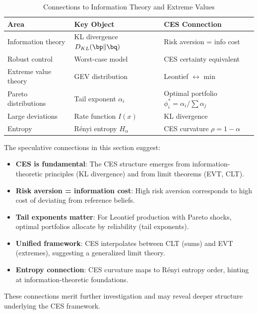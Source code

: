 \begin{table}[H]
\centering
\caption{Connections to Information Theory and Extreme Values}
\label{tab:ac-adv-summary}
\renewcommand{\arraystretch}{1.5}
\begin{tabular}{@{}lll@{}}
\toprule
\textbf{Area} & \textbf{Key Object} & \textbf{CES Connection} \\
\midrule
Information theory & KL divergence $D_{KL}(\bp \| \bq)$ & Risk aversion = info cost \\
Robust control & Worst-case model & CES certainty equivalent \\
Extreme value theory & GEV distribution & Leontief $\leftrightarrow$ min \\
Pareto distributions & Tail exponent $\alpha_i$ & Optimal portfolio $\phi_i^* = \alpha_i / \sum \alpha_j$ \\
Large deviations & Rate function $I(x)$ & KL divergence \\
Entropy & Rényi entropy $H_\alpha$ & CES curvature $\rho = 1 - \alpha$ \\
\bottomrule
\end{tabular}
\end{table}

\begin{callouttip}
The speculative connections in this section suggest:
\begin{itemize}[nosep]
\item \textbf{CES is fundamental}: The CES structure emerges from information-theoretic principles (KL divergence) and from limit theorems (EVT, CLT).
\item \textbf{Risk aversion = information cost}: High risk aversion corresponds to high cost of deviating from reference beliefs.
\item \textbf{Tail exponents matter}: For Leontief production with Pareto shocks, optimal portfolios allocate by reliability (tail exponents).
\item \textbf{Unified framework}: CES interpolates between CLT (sums) and EVT (extremes), suggesting a generalized limit theory.
\item \textbf{Entropy connection}: CES curvature maps to Rényi entropy order, hinting at information-theoretic foundations.
\end{itemize}
These connections merit further investigation and may reveal deeper structure underlying the CES framework.
\end{callouttip}

